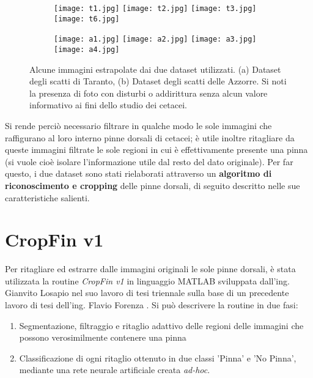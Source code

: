 \begin{figure}[h]

  \centering
  
  \begin{subfigure}[b]{\textwidth}
    \texttt{[image: t1.jpg]}
    \hfill
    \texttt{[image: t2.jpg]}
    \hfill
    \texttt{[image: t3.jpg]}
    \hfill
    \texttt{[image: t6.jpg]}
    \caption{}
  \end{subfigure}
  
  \vspace{5mm}
  
  \begin{subfigure}[b]{\textwidth}
    \texttt{[image: a1.jpg]}
    \hfill
    \texttt{[image: a2.jpg]}
    \hfill
    \texttt{[image: a3.jpg]}
    \hfill
    \texttt{[image: a4.jpg]}
    \caption{}
  \end{subfigure}
  
  \caption{Alcune immagini estrapolate dai due dataset utilizzati. (a) Dataset degli scatti di Taranto, (b) Dataset degli scatti delle Azzorre. Si noti la presenza di foto con disturbi o addirittura senza alcun valore informativo ai fini dello studio dei cetacei.}
  \label{fig:esempiDataset}
\end{figure}

Si rende perciò necessario filtrare in qualche modo le sole immagini che raffigurano al loro interno pinne dorsali di cetacei; è utile inoltre ritagliare da queste immagini filtrate le sole regioni in cui è effettivamente presente una pinna (si vuole cioè isolare l'informazione utile dal resto del dato originale). Per far questo, i due dataset sono stati rielaborati attraverso un \textbf{algoritmo di riconoscimento e cropping} delle pinne dorsali, di seguito descritto nelle sue caratteristiche salienti.

\section{CropFin v1}
\label{cropFin}
Per ritagliare ed estrarre dalle immagini originali le sole pinne dorsali, è stata utilizzata la routine \textit{CropFin v1} in linguaggio MATLAB sviluppata dall'ing. Gianvito Losapio nel suo lavoro di tesi triennale \cite{gianvito} sulla base di un precedente lavoro di tesi dell'ing. Flavio Forenza \cite{flavio}.
Si può descrivere la routine in due fasi:
\begin{enumerate}
\item Segmentazione, filtraggio e ritaglio adattivo delle regioni delle immagini che possono verosimilmente contenere una pinna
\item Classificazione di ogni ritaglio ottenuto in due classi 'Pinna' e 'No Pinna', mediante una rete neurale artificiale creata \textit{ad-hoc}.
\end{enumerate}

